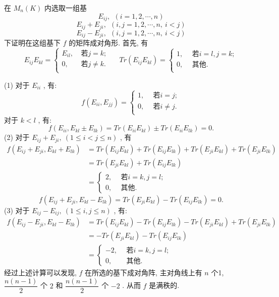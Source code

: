 \documentclass[11pt,a4paper,openany,oneside]{book}
\begin{document}
在 $ M_n(K) $ 内选取一组基
 $$  E_{ij}, \ \ (i=1, 2, \cdots, n)  $$ 
 $$  E_{ij} + E_{ji}, \ \ (i,j =1,2, \cdots, n, \ i < j)  $$ 
 $$  E_{ij} - E_{ji}, \ \ (i,j =1,2, \cdots, n, \ i < j)  $$ 
下证明在这组基下 $ f $ 的矩阵成对角形. 首先, 有
\begin{equation}
E_{ij}E_{kl} = \left\{
\begin{aligned}
E_{il}, \ &\text{若} j=k;\\
0, \ \ &\text{若} j \neq k. \\
\end{aligned}
\right. \ \ \ \ \ \ 
Tr(E_{ij}E_{kl}) = \left\{
\begin{aligned}
1, \ \ &\text{若}i=l, j=k; \\
0, \ \ &\text{其他}. \\
\end{aligned}
\right.
\end{equation}

(1) 对于 $ E_{ii} $ , 有:
\begin{equation}
f(E_{ii}, E_{jj}) = \left\{
\begin{aligned}
1, \ \ &\text{若}i=j; \\
0, \ \ &\text{若}i\neq j. \\
\end{aligned}
\right.
\end{equation}
对于 $ k < l $ , 有:
 $$  f(E_{ii}, E_{kl} \pm E_{lk}) = Tr(E_{ii}E_{kl}) \pm Tr(E_{ii}E_{lk}) = 0.  $$ 
(2) 对于 $ E_{ij} + E_{ji}, \ (1 \leq i < j \leq n) $ , 有
\begin{align*}
f(E_{ij}+E_{ji}, E_{kl}+E_{lk}) &= Tr(E_{ij}E_{kl}) + Tr(E_{ij}E_{lk}) + Tr(E_{ji}E_{kl}) + Tr(E_{ji}E_{lk}) \\
&= Tr(E_{ji}E_{kl}) + Tr(E_{ij}E_{lk}) \\
&=\left\{
\begin{aligned}
2, \ \ &\text{若}i=k, j=l; \\
0, \ \ &\text{其他}.
\end{aligned}
\right.
\end{align*}
 $$  f(E_{ij}+E_{ji}, E_{kl}- E_{lk}) = Tr(E_{ji}E_{kl}) - Tr(E_{ij}E_{lk}) = 0.  $$ 
(3) 对于 $ E_{ij} - E_{ij}, \ (1 \leq i, j \leq n) $ , 有:
\begin{align*}
f(E_{ij}-E_{ji}, E_{kl}-E_{lk}) &= Tr(E_{ij}E_{kl}) - Tr(E_{ij}E_{lk}) - Tr(E_{ji}E_{kl}) + Tr(E_{ji}E_{lk}) \\
&= -Tr(E_{ji}E_{kl}) - Tr(E_{ij}E_{lk}) \\
&=\left\{
\begin{aligned}
-2, \ \ &\text{若}i=k, j=l; \\
0, \ \ &\text{其他}.
\end{aligned}
\right.
\end{align*}
经过上述计算可以发现,  $ f $ 在所选的基下成对角阵, 主对角线上有 $ n $ 个1,  $ \dfrac{n(n-1)}{2} $ 个 $ 2 $ 和 $ \dfrac{n(n-1)}{2} $ 个 $ -2 $ . 从而 $ f $ 是满秩的. \\  \\  \\  
\end{document}
